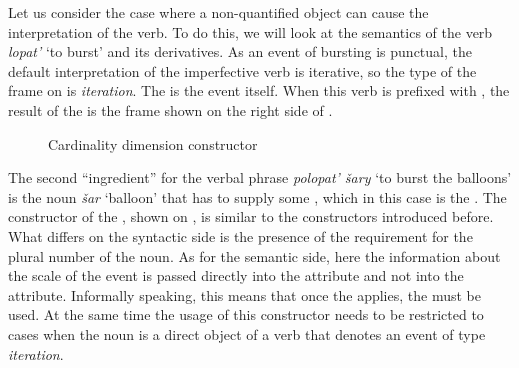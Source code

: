 Let us consider the case where a non-quantified object can cause the  interpretation of the verb. To do this, we will look at the semantics of the verb \textit{lopat'} `to burst' and its derivatives. As an event of bursting is punctual, the default interpretation of the imperfective verb is iterative, so the type of the frame on  is \textit{iteration}. The  is the event itself. When this verb is prefixed with , the result of the  is the frame shown on the right side of .

\begin{figure}
\small
{}
\hspace{1em}\normalsize%
\caption{Cardinality dimension constructor\label{constructor:cardinality}}
\end{figure}

The second ``ingredient'' for the verbal phrase \textit{polopat' \v{s}ary} `to burst the balloons' is the noun \textit{\v{s}ar} `balloon' that has to supply some , which in this case is the . The constructor of the , shown on , is similar to the constructors introduced before. What differs on the syntactic side is the presence of the requirement for the plural number of the noun. As for the semantic side, here the information about the scale of the event is passed directly into the \MDIM attribute and not into the \NOUNDIM attribute. Informally speaking, this means that once the  applies, the  must be used. At the same time the usage of this constructor needs to be restricted to cases when the noun is a direct object of a verb that denotes an event of type \textit{iteration}. 

